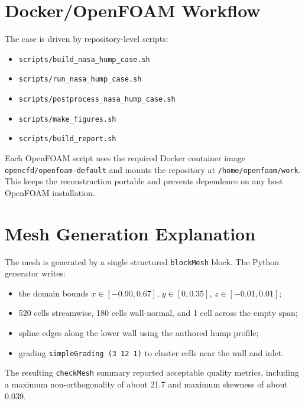 \documentclass[11pt]{article}
\begin{document}
\section{Docker/OpenFOAM Workflow}
The case is driven by repository-level scripts:
\begin{itemize}
\item \texttt{scripts/build\_nasa\_hump\_case.sh}
\item \texttt{scripts/run\_nasa\_hump\_case.sh}
\item \texttt{scripts/postprocess\_nasa\_hump\_case.sh}
\item \texttt{scripts/make\_figures.sh}
\item \texttt{scripts/build\_report.sh}
\end{itemize}

Each OpenFOAM script uses the required Docker container image \texttt{opencfd/openfoam-default} and mounts the repository at \texttt{/home/openfoam/work}. This keeps the reconstruction portable and prevents dependence on any host OpenFOAM installation.

\section{Mesh Generation Explanation}
The mesh is generated by a single structured \texttt{blockMesh} block. The Python generator writes:
\begin{itemize}
\item the domain bounds \(x\in[-0.90,0.67]\), \(y\in[0,0.35]\), \(z\in[-0.01,0.01]\);
\item 520 cells streamwise, 180 cells wall-normal, and 1 cell across the empty span;
\item spline edges along the lower wall using the authored hump profile;
\item grading \texttt{simpleGrading (3 12 1)} to cluster cells near the wall and inlet.
\end{itemize}

The resulting \texttt{checkMesh} summary reported acceptable quality metrics, including a maximum non-orthogonality of about 21.7 and maximum skewness of about 0.039.
\end{document}
